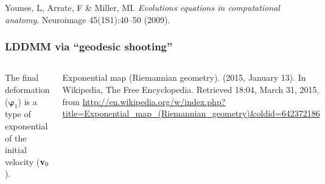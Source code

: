 \begin{frame}
\begin{columns}[c]
\begin{center}
\end{center}
\end{columns}
\vspace{.25cm}
\begin{tiny}
Younes, L, Arrate, F \& Miller, MI. \emph{Evolutions equations in computational anatomy}. Neuroimage 45(1S1):40--50 (2009).\par
\end{tiny}
\end{frame}


\begin{frame}
\frametitle{LDDMM via ``geodesic shooting''}
\begin{columns}[c]
The final deformation (${\boldsymbol\varphi}_1$) is a type of exponential of the initial velocity (${\bf v}_0$).
\vspace{0.25cm}
\begin{tiny}
Exponential map (Riemannian geometry). (2015, January 13). In Wikipedia, The Free Encyclopedia. Retrieved 18:04, March 31, 2015, from \url{http://en.wikipedia.org/w/index.php?title=Exponential\_map\_(Riemannian\_geometry)\&oldid=642372186}\par
\end{tiny}
\begin{center}

\end{center}
\end{columns}
\end{frame}
